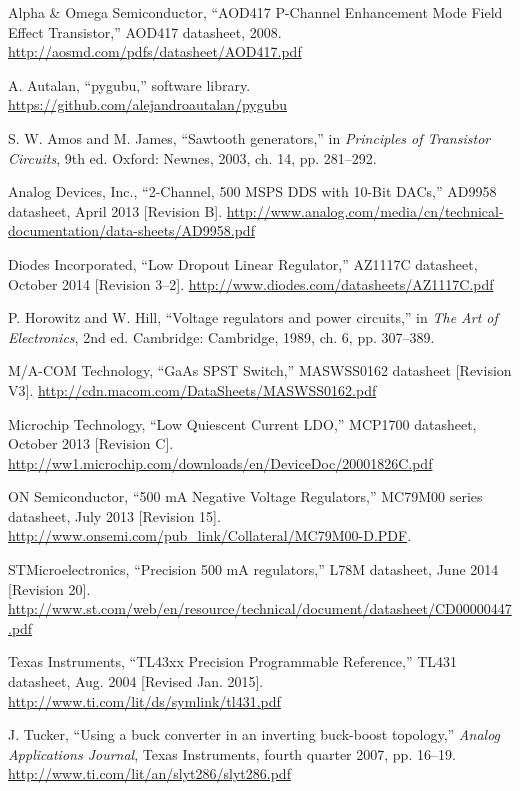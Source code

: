 \begin{thebibliography}{9}

Alpha \& Omega Semiconductor, ``AOD417 P-Channel Enhancement Mode Field Effect Transistor,''
AOD417 datasheet, 2008. \url{http://aosmd.com/pdfs/datasheet/AOD417.pdf}

A. Autalan, ``pygubu,'' software library. \url{https://github.com/alejandroautalan/pygubu}

S. W. Amos and M. James, ``Sawtooth generators,'' in
\emph{Principles of Transistor Circuits}, 9th ed. Oxford: Newnes, 2003, ch. 14, pp. 281--292.

Analog Devices, Inc., ``2-Channel, 500 MSPS DDS with 10-Bit DACs,'' AD9958 datasheet,
April 2013 [Revision B].
\url{http://www.analog.com/media/cn/technical-documentation/data-sheets/AD9958.pdf}

Diodes Incorporated, ``Low Dropout Linear Regulator,'' AZ1117C datasheet,
October 2014 [Revision 3--2].
\url{http://www.diodes.com/datasheets/AZ1117C.pdf}

P. Horowitz and W. Hill, ``Voltage regulators and power circuits,'' in
\emph{The Art of Electronics}, 2nd ed. Cambridge: Cambridge, 1989, ch. 6, pp. 307--389.

M/A-COM Technology, ``GaAs SPST Switch,'' MASWSS0162 datasheet [Revision V3].
\url{http://cdn.macom.com/DataSheets/MASWSS0162.pdf}

Microchip Technology, ``Low Quiescent Current LDO,'' MCP1700 datasheet,
October 2013 [Revision C].
\url{http://ww1.microchip.com/downloads/en/DeviceDoc/20001826C.pdf}

ON Semiconductor, ``500 mA Negative Voltage Regulators,'' MC79M00 series datasheet,
July 2013 [Revision 15].
\url{http://www.onsemi.com/pub_link/Collateral/MC79M00-D.PDF}.

STMicroelectronics, ``Precision 500 mA regulators,'' L78M datasheet, June 2014 [Revision 20].
\url{http://www.st.com/web/en/resource/technical/document/datasheet/CD00000447.pdf}

Texas Instruments, ``TL43xx Precision Programmable Reference,''
TL431 datasheet, Aug. 2004 [Revised Jan. 2015]. \url{http://www.ti.com/lit/ds/symlink/tl431.pdf}

J. Tucker, ``Using a buck converter in an inverting buck-boost topology,''
\emph{Analog Applications Journal}, Texas Instruments, fourth quarter 2007, pp. 16--19.
\url{http://www.ti.com/lit/an/slyt286/slyt286.pdf}
\end{thebibliography}
